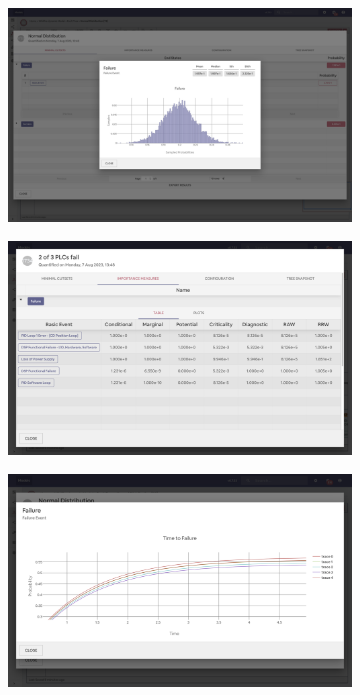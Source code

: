 \begin{figure}[h!]
  \centering
  \begin{subfigure}[b]{0.49\textwidth}
    \centering
    \includegraphics[width=\textwidth]{4_proposed_solution/web_app/figures/cutsets_uncertainty.png}
    \caption{}
  \end{subfigure}
  \begin{subfigure}[b]{0.49\textwidth}
    \centering
    \includegraphics[width=\textwidth]{4_proposed_solution/web_app/figures/importance.png}
    \caption{}
  \end{subfigure}
  \begin{subfigure}[b]{0.49\textwidth}
    \centering
    \includegraphics[width=\textwidth]{4_proposed_solution/web_app/figures/ttf.png}

\end{subfigure}
\end{figure}
